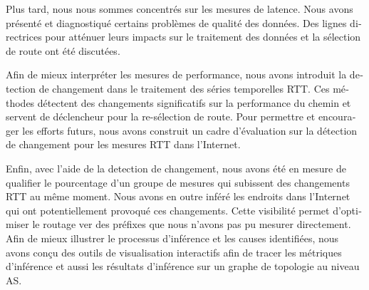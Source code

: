 \begin{otherlanguage}{french}
Plus tard, nous nous sommes concentrés sur les mesures de latence.
Nous avons présenté et diagnostiqué certains problèmes de qualité des données.
Des lignes directrices pour atténuer leurs impacts sur le traitement des données et la sélection de route ont été discutées.

Afin de mieux interpréter les mesures de performance, 
nous avons introduit la detection de changement dans le traitement des séries temporelles RTT.
Ces méthodes détectent des changements significatifs sur la performance du chemin et 
servent de déclencheur pour la re-sélection de route.
Pour permettre et encourager les efforts futurs, nous avons construit un cadre d'évaluation 
sur la détection de changement pour les mesures RTT dans l'Internet.

Enfin, avec l'aide de la detection de changement, nous avons été en mesure de qualifier 
le pourcentage d'un groupe de mesures qui subissent des changements RTT au même moment.
Nous avons en outre inféré les endroits dans l'Internet qui ont potentiellement provoqué ces changements.
Cette visibilité permet d'optimiser le routage ver des préfixes que nous n'avons pas pu mesurer directement.
Afin de mieux illustrer le processus d'inférence et les causes identifiées, 
nous avons conçu des outils de visualisation interactifs afin de tracer les métriques d'inférence et 
aussi les résultats d'inférence sur un graphe de topologie au niveau AS.
\end{otherlanguage}
\endgroup
\vfill
